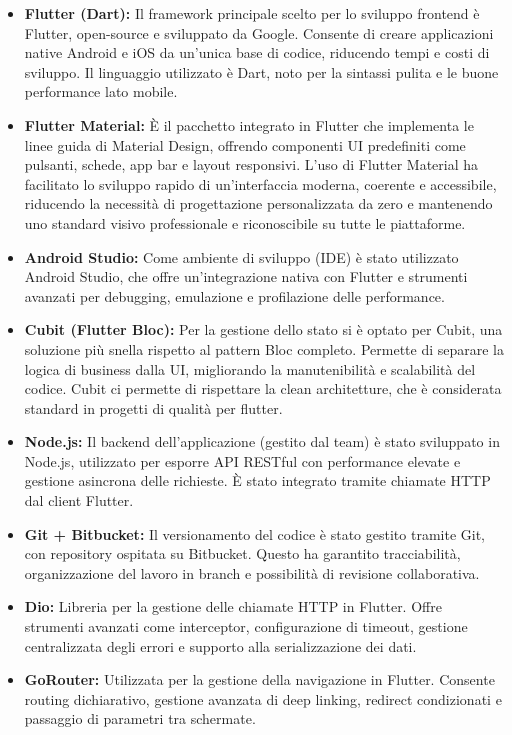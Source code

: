 \begin{itemize}
  \item \textbf{Flutter (Dart):} Il framework principale scelto per lo sviluppo frontend è Flutter, open-source e sviluppato da Google. Consente di creare applicazioni native Android e iOS da un’unica base di codice, riducendo tempi e costi di sviluppo. Il linguaggio utilizzato è Dart, noto per la sintassi pulita e le buone performance lato mobile.
  \item \textbf{Flutter Material:} È il pacchetto integrato in Flutter che implementa le linee guida di Material Design, offrendo componenti UI predefiniti come pulsanti, schede, app bar e layout responsivi. L’uso di Flutter Material ha facilitato lo sviluppo rapido di un’interfaccia moderna, coerente e accessibile, riducendo la necessità di progettazione personalizzata da zero e mantenendo uno standard visivo professionale e riconoscibile su tutte le piattaforme.    
  \item \textbf{Android Studio:} Come ambiente di sviluppo (IDE) è stato utilizzato Android Studio, che offre un’integrazione nativa con Flutter e strumenti avanzati per debugging, emulazione e profilazione delle performance.
  \item \textbf{Cubit (Flutter Bloc):} Per la gestione dello stato si è optato per Cubit, una soluzione più snella rispetto al pattern Bloc completo. Permette di separare la logica di business dalla UI, migliorando la manutenibilità e scalabilità del codice. Cubit ci permette di rispettare la clean architetture, che è considerata standard in progetti di qualità per flutter.
  \item \textbf{Node\@.js\@:} Il backend dell’applicazione (gestito dal team) è stato sviluppato in Node.js, utilizzato per esporre API RESTful con performance elevate e gestione asincrona delle richieste. È stato integrato tramite chiamate HTTP dal client Flutter.
  \item \textbf{Git + Bitbucket:} Il versionamento del codice è stato gestito tramite Git, con repository ospitata su Bitbucket. Questo ha garantito tracciabilità, organizzazione del lavoro in branch e possibilità di revisione collaborativa.
  \item \textbf{Dio:} Libreria per la gestione delle chiamate HTTP in Flutter. Offre strumenti avanzati come interceptor, configurazione di timeout, gestione centralizzata degli errori e supporto alla serializzazione dei dati. 
  \item \textbf{GoRouter:} Utilizzata per la gestione della navigazione in Flutter. Consente routing dichiarativo, gestione avanzata di deep linking, redirect condizionati e passaggio di parametri tra schermate.

\end{itemize}
